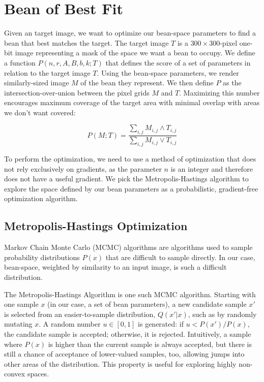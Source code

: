 \documentclass[%
reprint,
twocolumn,
nofootinbib,
 amsmath,amssymb,
 aps,
]{revtex4-2}
\begin{document}
\section{Bean of Best Fit}
\label{section:bestfit}


Given an target image, we want to optimize our bean-space parameters to find a bean that best matches the target. The target image $T$ is a $300 \times 300$-pixel one-bit image representing a mask of the space we want a bean to occupy. We define a function $P(n,r,A,B,b,k;T)$ that defines the score of a set of parameters in relation to the target image $T$. Using the bean-space parameters, we render similarly-sized image $M$ of the bean they represent. We then define $P$ as the intersection-over-union between the pixel grids $M$ and $T$. Maximizing this number encourages maximum coverage of the target area with minimal overlap with areas we don't want covered:

\begin{equation}
    P(M;T) = \frac{\sum_{i,j} M_{i,j} \land T_{i,j} }{\sum_{i,j} M_{i,j} \lor T_{i,j}}
\end{equation}

To perform the optimization, we need to use a method of optimization that does not rely exclusively on gradients, as the parameter $n$ is an integer and therefore does not have a useful gradient. We pick the Metropolis-Hastings algorithm to explore the space defined by our bean parameters as a probabilistic, gradient-free optimization algorithm.

\subsection{Metropolis-Hastings Optimization}

Markov Chain Monte Carlo (MCMC) algorithms are algorithms used to sample probability distributions $P(x)$ that are difficult to sample directly. In our case, bean-space, weighted by similarity to an input image, is such a difficult distribution.

The Metropolis-Hastings Algorithm is one such MCMC algorithm. Starting with one sample $x$ (in our case, a set of bean parameters), a new candidate sample $x'$ is selected from an easier-to-sample distribution, $Q(x' | x)$, such as by randomly mutating $x$. A random number $u \in [0,1]$ is generated: if $u < P(x')/P(x)$, the candidate sample is accepted; otherwise, it is rejected. Intuitively, a sample where $P(x)$ is higher than the current sample is always accepted, but there is still a chance of acceptance of lower-valued samples, too, allowing jumps into other areas of the distribution. This property is useful for exploring highly non-convex spaces.
\end{document}
